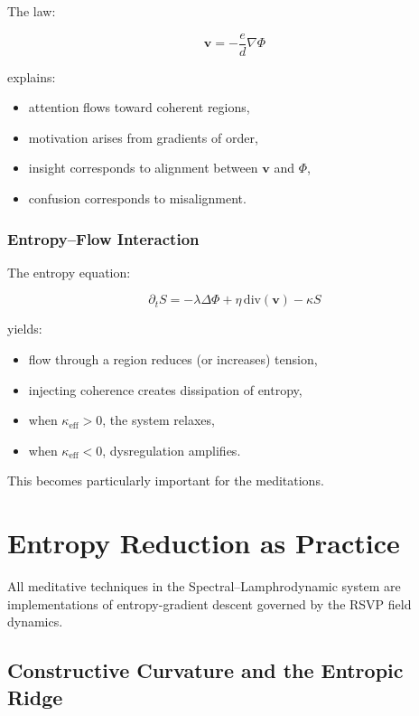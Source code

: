 \documentclass[12pt]{article}
\begin{document}
The law:

\[
\mathbf{v} = -\frac{e}{d}\nabla\Phi
\]

explains:

\begin{itemize}
    \item attention flows toward coherent regions,
    \item motivation arises from gradients of order,
    \item insight corresponds to alignment between $\mathbf{v}$ and $\Phi$,
    \item confusion corresponds to misalignment.
\end{itemize}

\subsection{Entropy–Flow Interaction}

The entropy equation:

\[
\partial_t S = -\lambda \Delta\Phi + \eta\,\mathrm{div}(\mathbf{v}) - \kappa S
\]

yields:

\begin{itemize}
    \item flow through a region reduces (or increases) tension,
    \item injecting coherence creates dissipation of entropy,
    \item when $\kappa_{\mathrm{eff}} > 0$, the system relaxes,
    \item when $\kappa_{\mathrm{eff}} < 0$, dysregulation amplifies.
\end{itemize}

This becomes particularly important for the meditations.

\newpage


\chapter{Entropy Reduction as Practice}

All meditative techniques in the Spectral--Lamphrodynamic system are
implementations of entropy-gradient descent governed by the RSVP field dynamics.

\section{Constructive Curvature and the Entropic Ridge}
\end{document}
